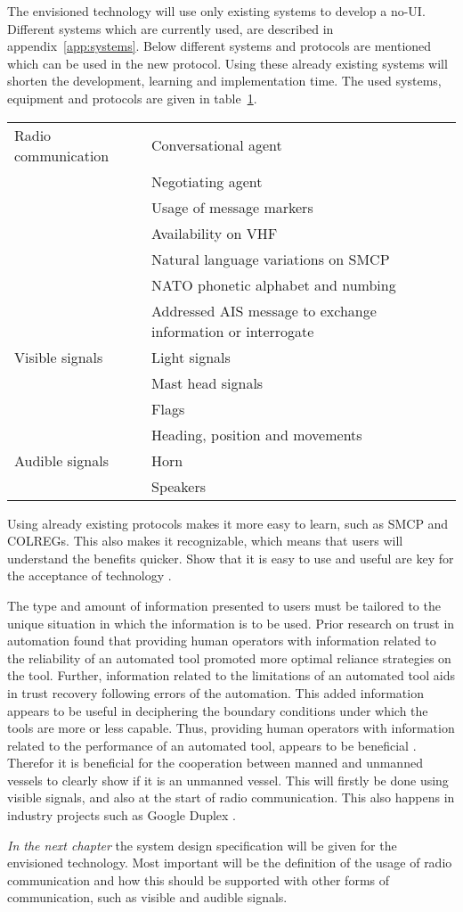 The envisioned technology will use only existing systems to develop a \ac{no-UI}. Different systems which are currently used, are described in appendix~\ref{app:systems}. Below different systems and protocols are mentioned which can be used in the new protocol. Using these already existing systems will shorten the development, learning and implementation time. The used systems, equipment and protocols are given in table~\ref{tab:envisioned-technology}.

\begin{table}[H]
	\centering
	\begin{tabular}{l|l}
		\toprule
		Radio communication & Conversational agent \\
			& Negotiating agent \\
			& Usage of message markers \\
			& Availability on \ac{VHF} \\
			& Natural language variations on \ac{SMCP} \\
			& NATO phonetic alphabet and numbing \\
			& Addressed \ac{AIS} message to exchange information or interrogate \\
		\midrule
		Visible signals & Light signals \\
			& Mast head signals \\
			& Flags \\
			& Heading, position and movements \\
		\midrule
		Audible signals & Horn \\
			& Speakers\\
		\bottomrule
	\end{tabular}
	
	\label{tab:envisioned-technology}
\end{table}

Using already existing protocols makes it more easy to learn, such as \acf{SMCP} and \ac{COLREGs}. This also makes it recognizable, which means that users will understand the benefits quicker. Show that it is easy to use and useful are key for the acceptance of technology \cite{Davis1989}.

The type and amount of information presented to users must be tailored to the unique situation in which the information is to be used. Prior research on trust in automation found that providing human operators with information related to the reliability of an automated tool promoted more optimal reliance strategies on the tool. Further, information related to the limitations of an automated tool aids in trust recovery following errors of the automation. This added information appears to be useful in deciphering the boundary conditions under which the tools are more or less capable. Thus, providing human operators with information related to the performance of an automated tool, appears to be beneficial \cite{Lyons2014}. Therefor it is beneficial for the cooperation between manned and unmanned vessels to clearly show if it is an unmanned vessel. This will firstly be done using visible signals, and also at the start of radio communication. This also happens in industry projects such as Google Duplex \cite{Nieva2018}.

\vspace{1.5cm}
\emph{In the next chapter} the system design specification will be given for the envisioned technology. Most important will be the definition of the usage of radio communication and how this should be supported with other forms of communication, such as visible and audible signals.
